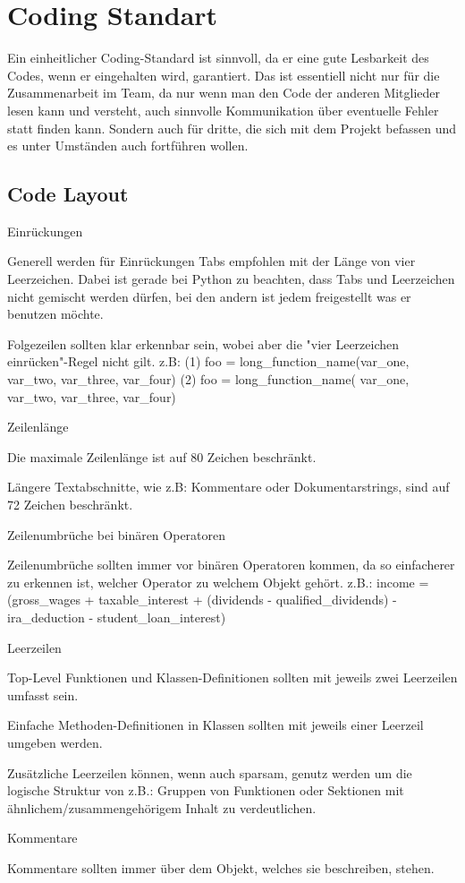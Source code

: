 \section{Coding Standart}
Ein einheitlicher Coding-Standard ist sinnvoll, da er eine gute Lesbarkeit des Codes, wenn er eingehalten wird, garantiert. Das ist essentiell nicht nur für die Zusammenarbeit im Team, da nur wenn man den Code der anderen Mitglieder lesen kann und versteht, auch sinnvolle Kommunikation über eventuelle Fehler statt finden kann. Sondern auch für dritte, die sich mit dem Projekt befassen und es unter Umständen auch fortführen wollen.

\subsection{Code Layout}
\begin{itemize}
Einrückungen
\begin{itemize}
Generell werden für Einrückungen Tabs empfohlen mit der Länge von vier Leerzeichen. Dabei ist gerade bei Python zu beachten, dass Tabs und Leerzeichen nicht gemischt werden dürfen, bei den andern ist jedem freigestellt was er benutzen möchte.

Folgezeilen sollten klar erkennbar sein, wobei aber die "vier Leerzeichen einrücken"-Regel nicht gilt.
z.B: 
(1) foo = long_function_name(var_one, var_two,
                         	 var_three, var_four)
(2) foo = long_function_name(
  	  var_one, var_two,
  	  var_three, var_four)                      
\end{itemize}
Zeilenlänge
\begin{itemize}
Die maximale Zeilenlänge ist auf 80 Zeichen beschränkt. 

Längere Textabschnitte, wie z.B: Kommentare oder Dokumentarstrings, sind auf 72 Zeichen beschränkt.
\end{itemize}
Zeilenumbrüche bei binären Operatoren
\begin{itemize}
Zeilenumbrüche sollten immer vor binären Operatoren kommen, da so einfacherer zu erkennen ist, welcher Operator zu welchem Objekt gehört.
z.B.: income = (gross_wages
         				 + taxable_interest
         				 + (dividends - qualified_dividends)
         				 - ira_deduction
         				 - student_loan_interest)
\end{itemize}
Leerzeilen
\begin{itemize}
Top-Level Funktionen und Klassen-Definitionen sollten mit jeweils zwei Leerzeilen umfasst sein.

Einfache Methoden-Definitionen in Klassen sollten mit jeweils einer Leerzeil umgeben werden.

Zusätzliche Leerzeilen können, wenn auch sparsam, genutz werden um die logische Struktur von z.B.: Gruppen von Funktionen oder Sektionen mit ähnlichem/zusammengehörigem Inhalt zu verdeutlichen.
\end{itemize}
Kommentare
\begin{itemize}
Kommentare sollten immer über dem Objekt, welches sie beschreiben, stehen.
\end{itemize}
\end{itemize}

